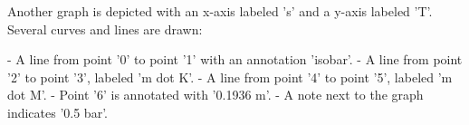 Another graph is depicted with an x-axis labeled 's' and a y-axis labeled 'T'. Several curves and lines are drawn:

- A line from point '0' to point '1' with an annotation 'isobar'.
- A line from point '2' to point '3', labeled 'm dot K'.
- A line from point '4' to point '5', labeled 'm dot M'.
- Point '6' is annotated with '0.1936 m'.
- A note next to the graph indicates '0.5 bar'.